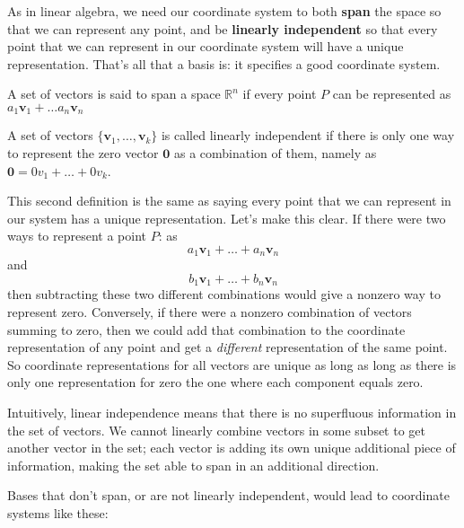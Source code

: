 \documentclass[../master.tex]{subfiles}
\begin{document}
	As in linear algebra, we need our coordinate system to both \textbf{span} the space so that we can represent any point, and be \textbf{linearly independent} so that every point that we can represent in our coordinate system will have a unique representation. That's all that a basis is: it specifies a good coordinate system. 
	
	\begin{defn}
		A set of vectors is said to span a space $\mathbb{R}^n$ if every point $P$ can be represented as $a_1 \mathbf v_1 + \dots a_n \mathbf v_n$
	\end{defn}
	
	\begin{defn}
		A set of vectors $\{\mathbf v_1, \dots , \mathbf v_k \}$ is called linearly independent if there is only one way to represent the zero vector $\mathbf 0$ as a combination of them, namely as $\mathbf 0 = 0v_1 + \dots + 0 v_k$.
	\end{defn}
	
	This second definition is the same as saying every point that we can represent in our system has a unique representation. Let's make this clear. If there were two ways to represent a point $P$: as \begin{equation*}
		a_1 \mathbf v_1 + \dots + a_n \mathbf v_n
	\end{equation*} 
	and 
	\begin{equation*}
		b_1 \mathbf v_1 + \dots + b_n \mathbf v_n
	\end{equation*} 
	then subtracting these two different combinations would give a nonzero way to represent zero.  Conversely, if there were a nonzero combination of vectors summing to zero, then we could add that combination to the coordinate representation of any point and get a \emph{different} representation of the same point. So coordinate representations for all vectors are unique as long as long as there is only one representation for zero the one where each component equals zero.
	
	Intuitively, linear independence means that there is no superfluous information in the set of vectors.  We cannot linearly combine vectors in some subset to get another vector in the set; each vector is adding its own unique additional piece of information, making the set able to span in an additional direction.
	
	Bases that don't span, or are not linearly independent, would lead to coordinate systems like these:
	
\end{document}
